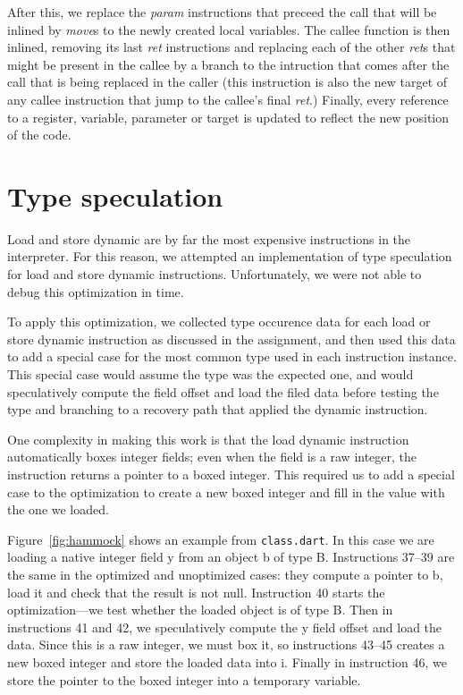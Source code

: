 \documentclass[10pt,twocolumn]{article}
\begin{document}
After this, we replace the \emph{param} instructions that preceed the call that will be inlined by \emph{move}s to the newly created local variables. The callee function is then
inlined, removing its last \emph{ret} instructions and replacing each of the other \emph{ret}s that might be present in the callee by a branch to the intruction that comes after
the call that is being replaced in the caller (this instruction is also the new target of any callee instruction that jump to the callee's final \emph{ret}.) Finally, every reference to a register, variable, parameter or target is updated to reflect the new position of the code.

\section{Type speculation}

Load and store dynamic are by far the most expensive instructions in
the interpreter. For this reason, we attempted an implementation of
type speculation for load and store dynamic
instructions. Unfortunately, we were not able to debug this
optimization in time.

To apply this optimization, we collected type occurence data for each
load or store dynamic instruction as discussed in the assignment, and
then used this data to add a special case for the most common type
used in each instruction instance. This special case would assume the
type was the expected one, and would speculatively compute the field
offset and load the filed data before testing the type and branching
to a recovery path that applied the dynamic instruction. 

One complexity in making this work is that the load dynamic
instruction automatically boxes integer fields; even when the field is
a raw integer, the instruction returns a pointer to a boxed
integer. This required us to add a special case to the optimization to
create a new boxed integer and fill in the value with the one we
loaded.

Figure~\ref{fig:hammock} shows an example from \texttt{class.dart}. In this
case we are loading a native integer field y from an object b of type
B. Instructions 37--39 are the same in the optimized and unoptimized
cases: they compute a pointer to b, load it and check that the result
is not null. Instruction 40 starts the optimization---we test whether
the loaded object is of type B. Then in instructions 41 and 42, we
speculatively compute the y field offset and load the data. Since this
is a raw integer, we must box it, so instructions 43--45 creates a new
boxed integer and store the loaded data into i. Finally in instruction
46, we store the pointer to the boxed integer into a temporary variable. 
\end{document}
